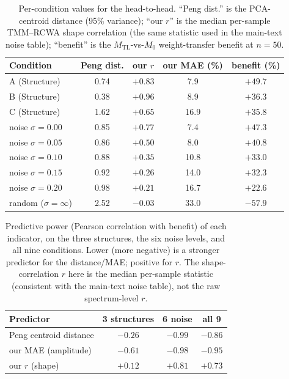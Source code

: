 \documentclass[11pt]{article}
\newcommand{\Mzero}{\ensuremath{M_0}}
\newcommand{\Mtl}{\ensuremath{M_\text{TL}}}
\begin{document}
\begin{table}[htbp]\centering\small
\caption{Per-condition values for the head-to-head. ``Peng dist.'' is the
PCA-centroid distance (95\% variance); ``our $r$'' is the median per-sample
TMM--RCWA shape correlation (the same statistic used in the main-text noise
table); ``benefit'' is the $\Mtl$-vs-$\Mzero$
weight-transfer benefit at $n=50$.}
\label{tab:peng_headtohead}
\begin{tabular}{lcccc}\toprule
\textbf{Condition} & \textbf{Peng dist.} & \textbf{our $r$} & \textbf{our MAE (\%)} & \textbf{benefit (\%)}\\\midrule
A (Structure)            & 0.74 & $+0.83$ & 7.9  & $+49.7$\\
B (Structure)            & 0.38 & $+0.96$ & 8.9  & $+36.3$\\
C (Structure)            & 1.62 & $+0.65$ & 16.9 & $+35.8$\\
noise $\sigma=0.00$      & 0.85 & $+0.77$ & 7.4  & $+47.3$\\
noise $\sigma=0.05$      & 0.86 & $+0.50$ & 8.0  & $+40.8$\\
noise $\sigma=0.10$      & 0.88 & $+0.35$ & 10.8 & $+33.0$\\
noise $\sigma=0.15$      & 0.92 & $+0.26$ & 14.0 & $+32.3$\\
noise $\sigma=0.20$      & 0.98 & $+0.21$ & 16.7 & $+22.6$\\
random ($\sigma=\infty$) & 2.52 & $-0.03$ & 33.0 & $-57.9$\\\bottomrule
\end{tabular}
\end{table}

\begin{table}[htbp]\centering\small
\caption{Predictive power (Pearson correlation with benefit) of each indicator,
on the three structures, the six noise levels, and all nine conditions. Lower
(more negative) is a stronger predictor for the distance/MAE; positive for $r$.
The shape-correlation $r$ here is the median per-sample statistic (consistent
with the main-text noise table), not the raw spectrum-level $r$.}
\label{tab:peng_corr}
\begin{tabular}{lccc}\toprule
\textbf{Predictor} & \textbf{3 structures} & \textbf{6 noise} & \textbf{all 9}\\\midrule
Peng centroid distance & $-0.26$ & $-0.99$ & $-0.86$\\
our MAE (amplitude)    & $\mathbf{-0.61}$ & $\mathbf{-0.98}$ & $\mathbf{-0.95}$\\
our $r$ (shape)        & $+0.12$ & $+0.81$ & $+0.73$\\\bottomrule
\end{tabular}
\end{table}
\end{document}
